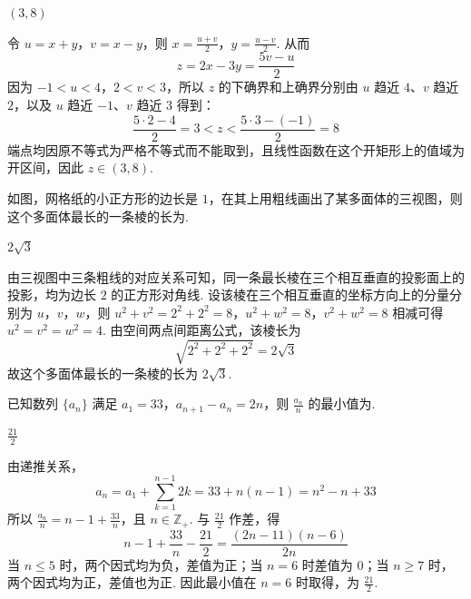 \begin{answer}
\((3,8)\)
\end{answer}

\begin{solution}
令 \(u=x+y\)，\(v=x-y\)，则
\(x=\frac{u+v}{2}\)，\(y=\frac{u-v}{2}\).
从而
\[
z=2x-3y=\frac{5v-u}{2}
\]
因为 \(-1<u<4\)，\(2<v<3\)，所以 \(z\) 的下确界和上确界分别由 \(u\) 趋近 \(4\)、\(v\) 趋近 \(2\)，以及 \(u\) 趋近 \(-1\)、\(v\) 趋近 \(3\) 得到：
\[
\frac{5\cdot2-4}{2}=3<z<\frac{5\cdot3-(-1)}{2}=8
\]
端点均因原不等式为严格不等式而不能取到，且线性函数在这个开矩形上的值域为开区间，因此 \(z\in(3,8)\).
\end{solution}

\begin{problem}
如图，网格纸的小正方形的边长是 \(1\)，在其上用粗线画出了某多面体的三视图，则这个多面体最长的一条棱的长为\fillinblank{}.
\end{problem}

\begin{answer}
\(2\sqrt{3}\)
\end{answer}

\begin{solution}
由三视图中三条粗线的对应关系可知，同一条最长棱在三个相互垂直的投影面上的投影，均为边长 \(2\) 的正方形对角线. 设该棱在三个相互垂直的坐标方向上的分量分别为 \(u\)，\(v\)，\(w\)，则
\(u^{2}+v^{2}=2^{2}+2^{2}=8\)，\(u^{2}+w^{2}=8\)，\(v^{2}+w^{2}=8\)
相减可得 \(u^{2}=v^{2}=w^{2}=4\). 由空间两点间距离公式，该棱长为
\[
\sqrt{2^{2}+2^{2}+2^{2}}=2\sqrt{3}
\]
故这个多面体最长的一条棱的长为 \(2\sqrt{3}\).
\end{solution}

\begin{problem}
已知数列 \(\{a_{n}\}\) 满足 \(a_{1} = 33\)，\(a_{n+1} - a_{n} = 2n\)，则 \(\frac{a_n}{n}\) 的最小值为\fillinblank{}.
\end{problem}

\begin{answer}
\(\frac{21}{2}\)
\end{answer}

\begin{solution}
由递推关系，
\[
a_n=a_1+\sum_{k=1}^{n-1}2k=33+n(n-1)=n^{2}-n+33
\]
所以
\(\frac{a_n}{n}=n-1+\frac{33}{n}\)，且 \(n\in\mathbb Z_{+}\).
与 \(\frac{21}{2}\) 作差，得
\[
n-1+\frac{33}{n}-\frac{21}{2}=\frac{(2n-11)(n-6)}{2n}
\]
当 \(n\leqslant5\) 时，两个因式均为负，差值为正；当 \(n=6\) 时差值为 \(0\)；当 \(n\geqslant7\) 时，两个因式均为正，差值也为正. 因此最小值在 \(n=6\) 时取得，为 \(\frac{21}{2}\).
\end{solution}


